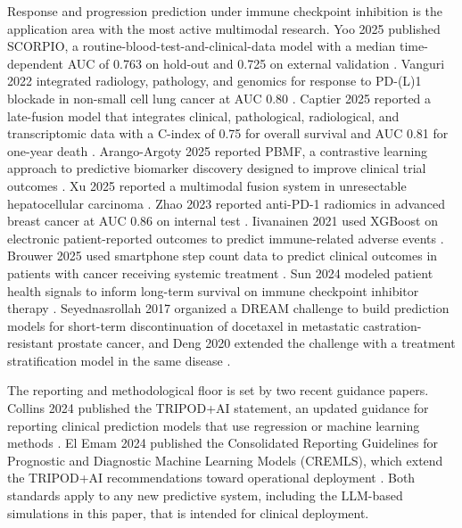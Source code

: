 Response and progression prediction under immune checkpoint inhibition
is the application area with the most active multimodal research.
Yoo 2025 published SCORPIO, a routine-blood-test-and-clinical-data model
with a median time-dependent AUC of 0.763 on hold-out and 0.725 on
external validation \cite{Yoo2025SCORPIO}. Vanguri 2022 integrated
radiology, pathology, and genomics for response to PD-(L)1 blockade in
non-small cell lung cancer at AUC 0.80
\cite{Vanguri2022MultimodalPDL1NSCLC}. Captier 2025 reported a
late-fusion model that integrates clinical, pathological, radiological,
and transcriptomic data with a C-index of 0.75 for overall survival
and AUC 0.81 for one-year death \cite{Captier2025MultimodalNSCLCImmunotherapy}.
Arango-Argoty 2025 reported PBMF, a contrastive learning approach to
predictive biomarker discovery designed to improve clinical trial
outcomes \cite{ArangoArgoty2025PBMF}. Xu 2025 reported a multimodal
fusion system in unresectable hepatocellular carcinoma
\cite{Xu2025MMF}. Zhao 2023 reported anti-PD-1 radiomics in advanced
breast cancer at AUC 0.86 on internal test \cite{Zhao2023BreastRadiomics}.
Iivanainen 2021 used XGBoost on electronic patient-reported outcomes
to predict immune-related adverse events
\cite{Iivanainen2021irAE}. Brouwer 2025 used smartphone step count
data to predict clinical outcomes in patients with cancer receiving
systemic treatment \cite{Brouwer2025StepCount}. Sun 2024 modeled
patient health signals to inform long-term survival on immune
checkpoint inhibitor therapy \cite{Sun2024HealthSignals}.
Seyednasrollah 2017 organized a DREAM challenge to build prediction
models for short-term discontinuation of docetaxel in metastatic
castration-resistant prostate cancer, and Deng 2020 extended the
challenge with a treatment stratification model in the same disease
\cite{Seyednasrollah2017Docetaxel, Deng2020mCRPC}.

The reporting and methodological floor is set by two recent guidance
papers. Collins 2024 published the TRIPOD+AI statement, an updated
guidance for reporting clinical prediction models that use regression
or machine learning methods \cite{Collins2024TRIPODAI}. El Emam 2024
published the Consolidated Reporting Guidelines for Prognostic and
Diagnostic Machine Learning Models (CREMLS), which extend the TRIPOD+AI
recommendations toward operational deployment \cite{ElEmam2024CREMLS}.
Both standards apply to any new predictive system, including the
LLM-based simulations in this paper, that is intended for clinical
deployment.

